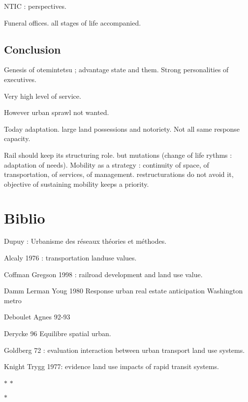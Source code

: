 NTIC : perspectives.

Funeral offices. all stages of life accompanied.

\subsection*{Conclusion}

Genesis of otemintetsu ; advantage state and them. Strong personalities of executives. 

Very high level of service.

However urban sprawl not wanted.

Today adaptation. large land possessions and notoriety. Not all same response capacity.

Rail should keep its structuring role. but mutations (change of life rythms : adaptation of needs). Mobility as a strategy : continuity of space, of transportation, of services, of management. restructurations do not avoid it, objective of sustaining mobility keeps a priority.


\section{Biblio}

Dupuy : Urbanisme des réseaux théories et méthodes.

Alcaly 1976 : transportation landuse values.

Coffman Gregson 1998  : railroad development and land use value.

Damm Lerman Youg 1980 Response urban real estate anticipation Washington metro


Deboulet Agnes 92-93

Derycke 96 Equilibre spatial urban.

Goldberg 72 : evaluation interaction between urban transport land use systems.

Knight Trygg 1977: evidence land use impacts of rapid transit systems.

{\centering

\vspace{2cm}

$\ast$ \hspace{1.5cm} $\ast$

\vspace{0.5cm}

$\ast$

}














